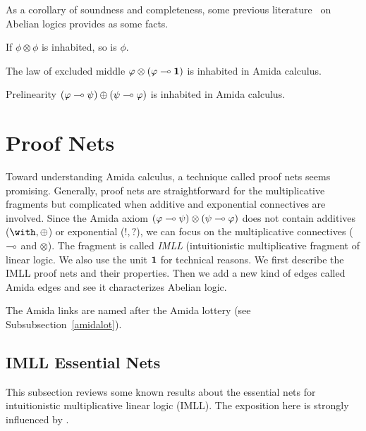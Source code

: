 As a corollary of soundness and completeness,
some previous literature~\citet{meyer-slaney-1989,casari1989} on
Abelian logics provides as some facts.
\begin{corollary}
 If $\phi\otimes\phi$ is inhabited, so is $\phi$.
\end{corollary}
\begin{corollary}
 The law of excluded middle $\varphi\otimes(\varphi\multimap \mathbf{1})$ is inhabited
 in Amida calculus.
\end{corollary}
\begin{corollary}
 Prelinearity $(\varphi\multimap\psi)\oplus(\psi\multimap\varphi)$ is
 inhabited in Amida calculus.
\end{corollary}

\section{Proof Nets}
\label{sec:proofnets}

Toward understanding Amida calculus, a technique called proof nets seems
promising.
Generally, proof nets are straightforward for the multiplicative
fragments but complicated when additive and exponential connectives are
involved.
Since the Amida axiom $(\varphi\multimap\psi)\otimes(\psi\multimap\varphi)$
does not contain additives ($\with,\oplus$) or exponential ($!,?$),
we can focus on the multiplicative connectives ($\multimap$ and $\otimes$).
The fragment is called \textit{IMLL} (intuitionistic multiplicative fragment of
linear logic.  We also use the unit $\mathbf{1}$ for technical reasons.
We first describe the IMLL proof nets and their properties.
Then we add a new kind of edges called Amida edges and see it
characterizes Abelian logic.

The Amida links are named after the Amida lottery (see
Subsubsection~\ref{amidalot}).

\subsection{IMLL Essential Nets}

This subsection reviews some known results about the essential
nets for
intuitionistic multiplicative linear logic
(IMLL). The exposition here is strongly
influenced by \citet{murawski2003}.

